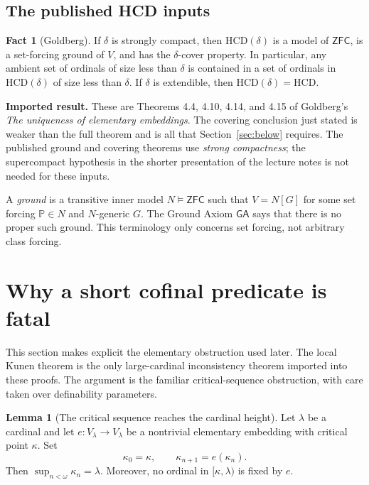 \documentclass[11pt,letterpaper]{article}
\theoremstyle{definition}
\newtheorem{lemma}[definition]{Lemma}
\newcommand{\ZFC}{\mathsf{ZFC}}
\newcommand{\HCD}{\mathrm{HCD}}
\newcommand{\GA}{\mathsf{GA}}
\newcommand{\Known}[1]{\textbf{Imported result.} #1}
\newtheorem{fact}[definition]{Fact}
\begin{document}
\subsection{The published HCD inputs}

\begin{fact}[Goldberg]\label{fact:hcd}
If $\delta$ is strongly compact, then $\HCD(\delta)$ is a model of $\ZFC$, is a
set-forcing ground of $V$, and has the $\delta$-cover property. In particular,
any ambient set of ordinals of size less than $\delta$ is contained in a set
of ordinals in $\HCD(\delta)$ of size less than $\delta$.
If $\delta$ is extendible, then $\HCD(\delta)=\HCD$.
\end{fact}

\Known{These are Theorems 4.4, 4.10, 4.14, and 4.15 of Goldberg's
\emph{The uniqueness of elementary embeddings}. \cite{unique}
The covering conclusion just stated is weaker than the full theorem and is
all that Section~\ref{sec:below} requires. The published ground and covering
theorems use \emph{strong compactness}; the supercompact hypothesis in the
shorter presentation of the lecture notes is not needed for these inputs.}

A \emph{ground} is a transitive inner model $N\models\ZFC$ such that
$V=N[G]$ for some set forcing $\mathbb P\in N$ and $N$-generic $G$.
The Ground Axiom $\GA$ says that there is no proper such ground.
This terminology only concerns set forcing, not arbitrary class forcing.

\section{Why a short cofinal predicate is fatal}\label{sec:critical}

This section makes explicit the elementary obstruction used later. The local
Kunen theorem is the only large-cardinal inconsistency theorem imported into
these proofs. The argument is the familiar critical-sequence obstruction,
with care taken over definability parameters. \cite{kunen,hkp,cover}

\begin{lemma}[The critical sequence reaches the cardinal height]\label{lem:critical}
Let $\lambda$ be a cardinal and let $e:V_\lambda\to V_\lambda$ be a nontrivial
elementary embedding with critical point $\kappa$. Set
\[
 \kappa_0=\kappa,\qquad \kappa_{n+1}=e(\kappa_n).
\]
Then $\sup_{n<\omega}\kappa_n=\lambda$. Moreover, no ordinal in
$[\kappa,\lambda)$ is fixed by $e$.
\end{lemma}
\end{document}
